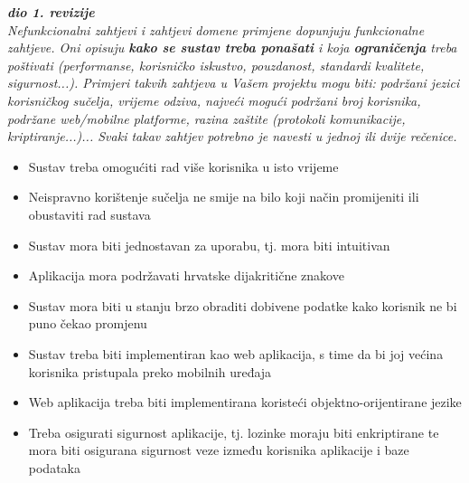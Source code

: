 			\textbf{\textit{dio 1. revizije}}\\
		 
			 \textit{Nefunkcionalni zahtjevi i zahtjevi domene primjene dopunjuju funkcionalne zahtjeve. Oni opisuju \textbf{kako se sustav treba ponašati} i koja \textbf{ograničenja} treba poštivati (performanse, korisničko iskustvo, pouzdanost, standardi kvalitete, sigurnost...). Primjeri takvih zahtjeva u Vašem projektu mogu biti: podržani jezici korisničkog sučelja, vrijeme odziva, najveći mogući podržani broj korisnika, podržane web/mobilne platforme, razina zaštite (protokoli komunikacije, kriptiranje...)... Svaki takav zahtjev potrebno je navesti u jednoj ili dvije rečenice.}
			 \begin{itemize}
			 	\item  Sustav treba omogućiti rad više korisnika u isto vrijeme
			 	\item  Neispravno korištenje sučelja ne smije na bilo koji način promijeniti ili obustaviti rad sustava
			 	\item  Sustav mora biti jednostavan za uporabu, tj. mora biti intuitivan
			 	\item Aplikacija mora podržavati hrvatske dijakritične znakove
			 	\item  Sustav mora biti u stanju brzo obraditi dobivene podatke kako korisnik ne bi puno čekao promjenu
			 	\item  Sustav treba biti implementiran kao web aplikacija, s time da bi joj većina korisnika pristupala preko mobilnih uređaja
			 	\item Web aplikacija treba biti implementirana koristeći objektno-orijentirane jezike
			 	\item  Treba osigurati sigurnost aplikacije, tj. lozinke moraju biti enkriptirane te mora biti osigurana sigurnost veze između korisnika aplikacije i baze podataka 
			 \end{itemize}
			 
			 
	